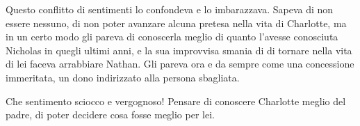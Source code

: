 \documentclass[a4paper,oneside,11pt]{memoir}
\begin{document}
Questo conflitto di sentimenti lo confondeva e lo imbarazzava. Sapeva di non essere nessuno, di non
poter avanzare alcuna pretesa nella vita di Charlotte, ma in un certo modo gli pareva di conoscerla
meglio di quanto l'avesse conosciuta Nicholas in quegli ultimi anni, e la sua improvvisa smania di
di tornare nella vita di lei faceva arrabbiare Nathan. Gli pareva ora e da sempre come una
concessione immeritata, un dono indirizzato alla persona sbagliata.

Che sentimento sciocco e vergognoso! Pensare di conoscere Charlotte meglio del padre, di poter
decidere cosa fosse meglio per lei.
\end{document}

